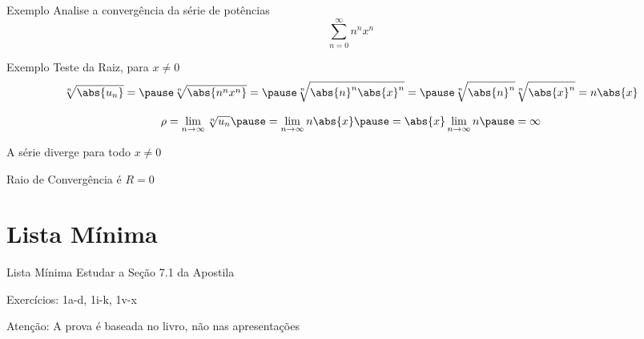 \documentclass[fleqn,utf8,aspectratio=169,12pt]{beamer}
\begin{document}
\addtocounter{exemplo}{1}
\begin{frame}{Exemplo \theexemplo}
  Analise a convergência da série de potências
  \[
    \sum_{n=0}^\infty n^n x^n
  \]
\end{frame}

\begin{frame}{Exemplo \theexemplo}
  Teste da Raiz, para \(x\neq 0\)
  \pause
  \[
    \sqrt[n]{\abs{u_n}} =
    \pause
    \sqrt[n]{\abs{n^nx^n}} =
    \pause
    \sqrt[n]{\abs{n}^n\abs{x}^n} =
    \pause
    \sqrt[n]{\abs{n}^n} \sqrt[n]{\abs{x}^n} =
    n\abs{x}
  \]

  \pause
  \[
    \rho
    = \lim_{n\to\infty} \sqrt[n]{u_n}
    \pause
    = \lim_{n\to\infty} n\abs{x}
    \pause
    = \abs{x} \lim_{n\to\infty} n
    \pause
    = \infty
  \]

  \pause
  \vspace{0.7\baselineskip}
  A série diverge para todo \(x\neq 0\)

  \pause
  \vspace{0.5\baselineskip}
  Raio de Convergência é $R=0$
\end{frame}

\section{Lista Mínima}

\begin{frame}{Lista Mínima}
  Estudar a Seção 7.1 da Apostila

  \vspace{\baselineskip}
  Exercícios: 1a-d, 1i-k, 1v-x

  \vfill
  Atenção: A prova é baseada no livro, não nas apresentações
\end{frame}

\end{document}
